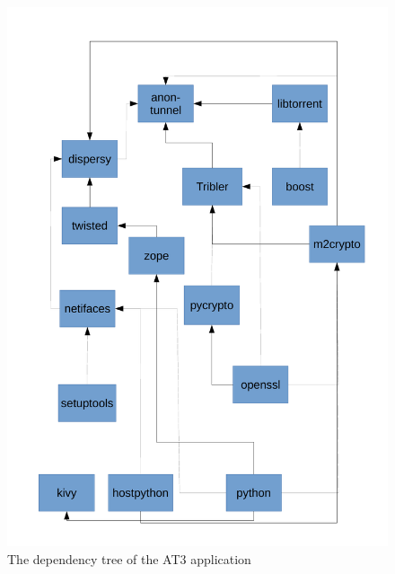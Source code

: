 \begin{figure}[p]
    \centering
    \includegraphics[width=\textwidth]{appendices/dependency-tree.pdf}
    \caption{The dependency tree of the AT3 application}
    \label{fig:dependency-tree}
\end{figure}